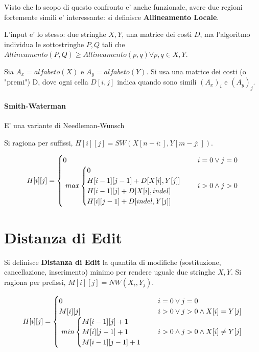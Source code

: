 Visto che lo scopo di questo confronto e' anche funzionale, avere due regioni fortemente simili e' interessante: si definisce \textbf{Allineamento Locale}.

L'input e' lo stesso: due stringhe $X, Y$, una matrice dei costi $D$, ma l'algoritmo individua le sottostringhe $P, Q$ tali che $Allineamento(P, Q) \geq Allineamento(p, q) \forall p,q \in X, Y$.

Sia $A_x = alfabeto(X)$ e $A_y = alfabeto(Y)$. Si usa una matrice dei costi (o "premi") D, dove ogni cella $D[i,j]$ indica quando sono simili $(A_x)_i$ e $(A_y)_j$.

\paragraph{Smith-Waterman}
E' una variante di Needleman-Wunsch

Si ragiona per suffissi, $H[i][j] = SW(X[n-i:], Y[m-j:])$.

\[
H[i][j] =
\begin{cases}
  \text{$0$} & \text{$i = 0 \lor j = 0$} \\
  \text{
    $
    max 
    \begin{cases}
      0 \\
      H[i-1][j-1] + D[X[i], Y[j]] \\
      H[i-1][j] + D[X[i], indel] \\
      H[i][j-1] + D[indel, Y[j]] \\
    \end{cases}
    $
  } & \text{$i > 0 \land j > 0$}
\end{cases}
\]

\section{Distanza di Edit}

Si definisce \textbf{Distanza di Edit} la quantita di modifiche (sostituzione, cancellazione, inserimento) minimo per rendere uguale due stringhe $X,Y$.
Si ragiona per prefissi, $M[i][j] = NW(X_i, Y_j)$.

\[
H[i][j] =
\begin{cases}
  \text{$0$} & \text{$i = 0 \lor j = 0$} \\
  \text{$M[i][j]$} & \text{$i > 0 \lor j > 0 \land X[i] = Y[j]$} \\
  \text{
    $
    min
    \begin{cases}
      M[i-1][j] + 1 \\
      M[i][j-1] + 1 \\
      M[i-1][j-1] + 1 \\
    \end{cases}
    $
  } & \text{$i > 0 \land j > 0 \land X[i] \neq Y[j]$}
\end{cases}
\]

